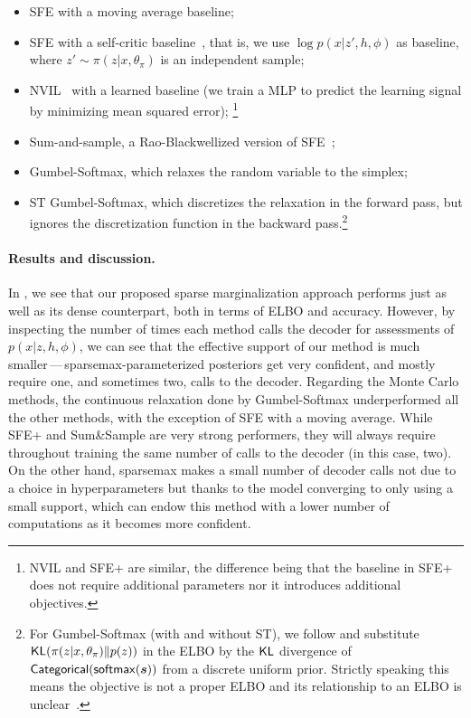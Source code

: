 \begin{itemize}
    \item SFE with a moving average baseline;
    \item SFE with a self-critic
          baseline~\citep[SFE+;][]{rennie2017self}, that is, we use $\log
              p(x|z', h, \phi)$ as baseline, where $z' \sim \pi(z|x, \theta_\pi)$
          is an independent sample;
    \item NVIL~\citep{mnih2014neural}
          with a learned baseline (we train a MLP to predict the learning
          signal by minimizing mean squared error);
          \footnote{NVIL and SFE+ are
              similar, the difference being that the baseline in SFE+ does not
              require additional parameters nor it introduces additional
              objectives.}
    \item Sum-and-sample, a Rao-Blackwellized
          version of SFE~\citep{RB19};
    \item Gumbel-Softmax, which relaxes the random variable to the simplex;
    \item ST Gumbel-Softmax, which discretizes the relaxation in
          the forward pass, but ignores the discretization function in the
          backward pass.\footnote{For Gumbel-Softmax (with and
              without ST), we follow \citet{GumbelSoftmax} and substitute
              $\operatorname{\mathsf{KL}}(\pi(z|x, \theta_\pi) \| p(z))$ in the ELBO by the $\operatorname{\mathsf{KL}}$
              divergence of $\operatorname{\mathsf{Categorical}}(\operatorname*{\mathsf{softmax}}(\bm{s}))$ from a discrete uniform prior.
              Strictly speaking this means the objective is not a proper ELBO and
              its relationship to an ELBO is unclear~\citep[Appendix
                  C.2]{Concrete}.}
\end{itemize}

\paragraph*{Results and discussion.}

In , we see that our proposed sparse
marginalization approach performs just as well as its dense
counterpart, both in terms of ELBO and accuracy. However, by
inspecting the number of times each method calls the decoder for
assessments of $p(x|z, h,\phi)$, we can see that the effective
support of our method is much smaller\,---\,sparsemax-parameterized
posteriors get very confident, and mostly require one, and sometimes
two, calls to the decoder. Regarding the Monte Carlo methods, the
continuous relaxation done by Gumbel-Softmax underperformed all the
other methods, with the exception of SFE with a moving average. While
SFE+ and Sum\&Sample are very strong performers, they will always
require throughout training the same number of calls to the decoder
(in this case, two). On the other hand, sparsemax makes a small
number of decoder calls not due to a choice in hyperparameters but
thanks to the model converging to only using a small support, which
can endow this method with a lower number of computations as it
becomes more confident.

